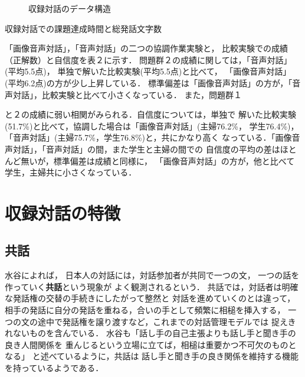 \begin{figure}
\begin{center}
\end{center}
\vspace{-1mm}
\caption{収録対話のデータ構造}
\end{figure}
\begin{table}
\vspace{3mm}
\caption{収録対話での課題達成時間と総発話文字数}
\end{table}

「画像音声対話」，「音声対話」の二つの協調作業実験と，
比較実験での成績（正解数）と自信度を表２に示す．
問題群２の成績に関しては，「音声対話」(平均5.5点)，
単独で解いた比較実験(平均5.5点)と比べて，
「画像音声対話」(平均6.2点)の方が少し上昇している．
標準偏差は「画像音声対話」の方が，「音声対話」，比較実験と比べて小さくなっている．
また，問題群１
\begin{minipage}{\textwidth}
と２の成績に弱い相関がみられる．自信度については，単独で
解いた比較実験(51.7\%)と比べて，協調した場合は「画像音声対話」(主婦76.2\%，
学生76.4\%)，「音声対話」(主婦75.7\%，学生76.8\%)と，共にかなり高く
なっている．「画像音声対話」，「音声対話」の間，また学生と主婦の間での
自信度の平均の差はほとんど無いが，標準偏差は成績と同様に，
「画像音声対話」の方が，他と比べて学生，主婦共に小さくなっている．
\end{minipage}
\clearpage

\section{収録対話の特徴}
\vspace{-1mm}
\subsection{共話}
\vspace{-2mm}

水谷によれば\cite{Mizutani1984,Mizutani1988}，
日本人の対話には，対話参加者が共同で一つの文，
一つの話を作っていく{\bf 共話}という現象が
よく観測されるという．
共話では，対話者は明確な発話権の交替の手続きにしたがって整然と
対話を進めていくのとは違って，
相手の発話に自分の発話を重ねる，合いの手として頻繁に相槌を挿入する，
一つの文の途中で発話権を譲り渡すなど，これまでの対話管理モデルでは
捉えきれないものを含んでいる．
水谷も「話し手の自己主張よりも話し手と聞き手の良き人間関係を
重んじるという立場に立てば，相槌は重要かつ不可欠のものとなる」
\cite{Mizutani1988}と述べているように，共話は
話し手と聞き手の良き関係を維持する機能を持っているようである．

